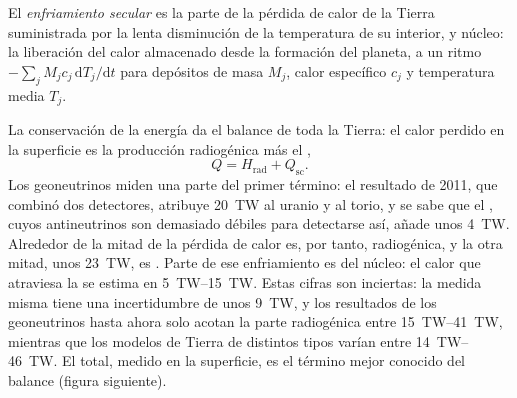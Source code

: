\begin{definition}\label{def:b1:heat-budget:secular-cooling}
El \emph{enfriamiento secular} es la parte de la pérdida de calor de la Tierra suministrada por la lenta
disminución de la temperatura de su interior,  y núcleo: la liberación del calor almacenado desde la formación del planeta,
a un ritmo $-\sum_j M_j c_j\,\mathrm dT_j/\mathrm dt$ para depósitos de masa $M_j$, calor específico $c_j$ y temperatura media $T_j$.
\end{definition}
La conservación de la energía da el balance de toda la Tierra: el calor perdido en la superficie es la producción radiogénica más el
,
\[
  Q = H_{\text{rad}} + Q_{\text{sc}} .
\]
Los geoneutrinos miden una parte del primer término: el resultado de 2011, que combinó dos detectores, atribuye \qty{20}{TW} al
uranio y al torio, y se sabe que el , cuyos antineutrinos son demasiado débiles para detectarse así, añade unos
\qty{4}{TW}.
Alrededor de la mitad de la pérdida de calor es, por tanto, radiogénica, y la otra mitad, unos \qty{23}{TW}, es . Parte de ese enfriamiento es del núcleo: el calor que atraviesa la  se estima en
\qtyrange{5}{15}{TW}. Estas cifras son inciertas: la medida misma tiene una incertidumbre de unos \qty{9}{TW}, y los resultados
de los geoneutrinos hasta ahora solo acotan la parte radiogénica entre \qtyrange{15}{41}{TW}, mientras que los modelos de Tierra
de distintos tipos varían entre \qtyrange{14}{46}{TW}. El total, medido en la superficie, es el término mejor conocido del balance
(figura siguiente).

